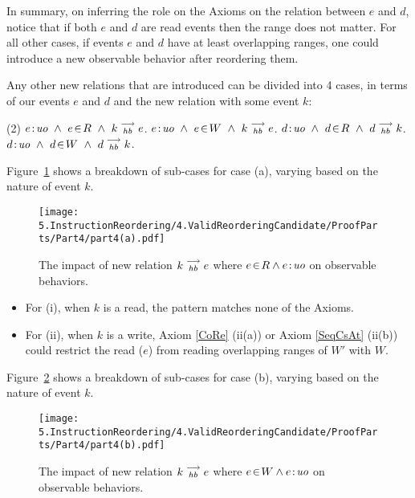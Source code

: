     In summary, on inferring the role on the Axioms on the relation between $e$ and $d$, notice that if both $e$ and $d$ are read events then the range does not matter. 
    For all other cases, if events $e$ and $d$ have at least overlapping ranges, one could introduce a new observable behavior after reordering them.
    
    Any other new relations that are introduced can be divided into 4 cases, in terms of our events $e$ and $d$ and the new relation with some event $k$:
    \begin{tasks}(2)
        \task  $\et{e}{uo} \ \wedge \ \event{e}{R} \ \wedge \ \reln{k}{hb}{e}$.
        \task  $e\!:\!\textit{uo} \ \wedge \ e\!\in\!W \ \wedge \ k\stackrel{\longrightarrow}{_{hb}}e$.
        \task  $\et{d}{uo} \ \wedge \ \event{d}{R} \ \wedge \ \reln{d}{hb}{k}$.
        \task  $d\!:\!\textit{uo} \ \wedge \ d\!\in\!W \ \wedge \ d\stackrel{\longrightarrow}{_{hb}}k$.
    \end{tasks}
    
    Figure~\ref{reord:case1} shows a breakdown of sub-cases for case (a), varying based
    on the nature of event $k$.
    \begin{figure}[H]
        \centering
        \texttt{[image: 5.InstructionReordering/4.ValidReorderingCandidate/ProofParts/Part4/part4(a).pdf]}
        \caption{The impact of new relation $k\stackrel{\longrightarrow}{_{hb}}e$ where $e\!\in\!R \wedge e\!:\!\textit{uo}$ on observable behaviors.}
        \label{reord:case1}
    \end{figure}
    
    \begin{itemize}
        \item For (i), when $k$ is a read, the pattern matches none of the Axioms.
        \item For (ii), when $k$ is a write, Axiom \ref{CoRe} (ii(a)) or Axiom \ref{SeqCsAt} (ii(b)) could restrict the read ($e$) from reading overlapping ranges of $W'$ with $W$.
    \end{itemize}
    
    Figure~\ref{reord:case2} shows a breakdown of sub-cases for case (b), varying based
    on the nature of event $k$.
    \begin{figure}[H]
        \centering
        \texttt{[image: 5.InstructionReordering/4.ValidReorderingCandidate/ProofParts/Part4/part4(b).pdf]}
        \caption{The impact of new relation $k\stackrel{\longrightarrow}{_{hb}}e$ where $e\!\in\!W \wedge e\!:\!\textit{uo}$ on observable behaviors.}
        \label{reord:case2}
    \end{figure}
          
